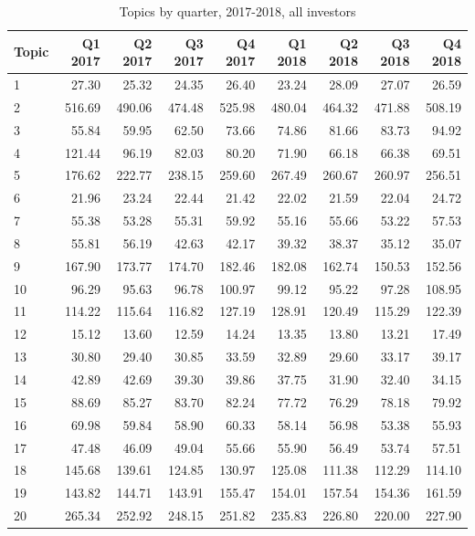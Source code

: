 \begin{table}[]
\caption[Topics by Quarter, 2017-2018, All Investors]{Topics by quarter, 2017-2018, all investors}
		\small
	\begin{tabular}{l|rrrrrrrr}
		Topic & Q1 2017 & Q2 2017 & Q3 2017 & Q4 2017 & Q1 2018 & Q2 2018 & Q3 2018 & Q4 2018 \\
		\hline
		1 & 27.30 & 25.32 & 24.35 & 26.40 & 23.24 & 28.09 & 27.07 & 26.59 \\
		2 & 516.69 & 490.06 & 474.48 & 525.98 & 480.04 & 464.32 & 471.88 & 508.19 \\
		3 & 55.84 & 59.95 & 62.50 & 73.66 & 74.86 & 81.66 & 83.73 & 94.92 \\
		4 & 121.44 & 96.19 & 82.03 & 80.20 & 71.90 & 66.18 & 66.38 & 69.51 \\
		5 & 176.62 & 222.77 & 238.15 & 259.60 & 267.49 & 260.67 & 260.97 & 256.51 \\
		6 & 21.96 & 23.24 & 22.44 & 21.42 & 22.02 & 21.59 & 22.04 & 24.72 \\
		7 & 55.38 & 53.28 & 55.31 & 59.92 & 55.16 & 55.66 & 53.22 & 57.53 \\
		8 & 55.81 & 56.19 & 42.63 & 42.17 & 39.32 & 38.37 & 35.12 & 35.07 \\
		9 & 167.90 & 173.77 & 174.70 & 182.46 & 182.08 & 162.74 & 150.53 & 152.56 \\
		10 & 96.29 & 95.63 & 96.78 & 100.97 & 99.12 & 95.22 & 97.28 & 108.95 \\
		11 & 114.22 & 115.64 & 116.82 & 127.19 & 128.91 & 120.49 & 115.29 & 122.39 \\
		12 & 15.12 & 13.60 & 12.59 & 14.24 & 13.35 & 13.80 & 13.21 & 17.49 \\
		13 & 30.80 & 29.40 & 30.85 & 33.59 & 32.89 & 29.60 & 33.17 & 39.17 \\
		14 & 42.89 & 42.69 & 39.30 & 39.86 & 37.75 & 31.90 & 32.40 & 34.15 \\
		15 & 88.69 & 85.27 & 83.70 & 82.24 & 77.72 & 76.29 & 78.18 & 79.92 \\
		16 & 69.98 & 59.84 & 58.90 & 60.33 & 58.14 & 56.98 & 53.38 & 55.93 \\
		17 & 47.48 & 46.09 & 49.04 & 55.66 & 55.90 & 56.49 & 53.74 & 57.51 \\
		18 & 145.68 & 139.61 & 124.85 & 130.97 & 125.08 & 111.38 & 112.29 & 114.10 \\
		19 & 143.82 & 144.71 & 143.91 & 155.47 & 154.01 & 157.54 & 154.36 & 161.59 \\
		20 & 265.34 & 252.92 & 248.15 & 251.82 & 235.83 & 226.80 & 220.00 & 227.90 \\

\end{tabular}
\end{table}
